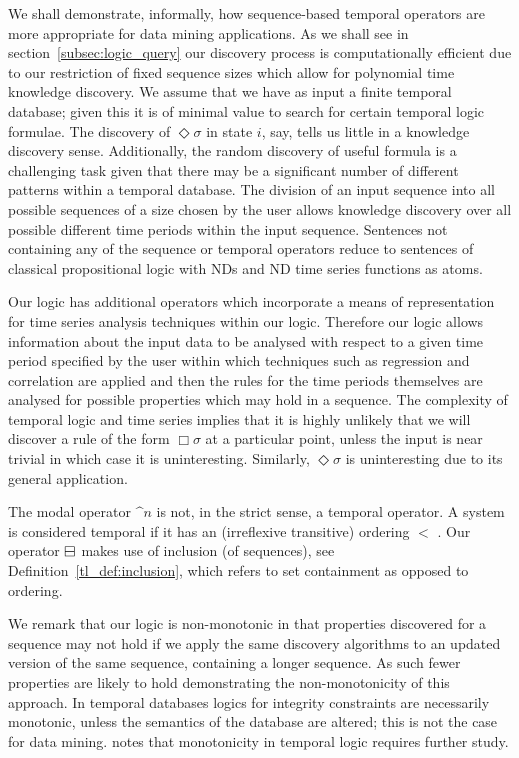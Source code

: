 \smallskip

We shall demonstrate, informally, how sequence-based temporal operators
are more appropriate for data mining applications. As we shall see in
section~\ref{subsec:logic_query} our discovery process is
computationally efficient due to our restriction of fixed sequence
sizes which allow for polynomial time knowledge discovery. We assume that we
have as input a finite temporal database; given this it is of minimal
value to search for certain temporal logic formulae. The discovery of
$\Diamond \sigma$ in state $i$, say, tells us little in a knowledge
discovery sense.  Additionally, the random discovery of useful formula
is a challenging task given that there may be a significant number of
different patterns within a temporal database. The division of an
input sequence into all possible sequences of a size chosen by the
user allows knowledge discovery over all possible different time
periods within the input sequence. Sentences not containing any of the
sequence or temporal operators reduce to sentences of classical
propositional logic with NDs and ND time series functions as atoms.

\medskip

Our logic has additional operators which incorporate a means of
representation for time series analysis techniques within our
logic. Therefore our logic allows information about the input data to
be analysed with respect to a given time period specified by the user
within which techniques such as regression and correlation are applied
and then the rules for the time periods themselves are analysed for
possible properties which may hold in a sequence. The complexity of
temporal logic and time series implies that it is highly unlikely that
we will discover a rule of the form $\Box \sigma$ at a particular
point, unless the input is near trivial in which case it is
uninteresting. Similarly, $\Diamond \sigma$ is uninteresting due to
its general application.

\medskip

The modal operator $\bm^n$ is not, in the strict sense, a temporal
operator. A system is considered temporal if it has an (irreflexive
transitive) ordering $<$ \cite{ghr94}. Our operator $\boxminus$ makes use of
inclusion (of sequences), see Definition~\ref{tl_def:inclusion}, which
refers to set containment as opposed to ordering.

\smallskip

We remark that our logic is non-monotonic in that properties
discovered for a sequence may not hold if we apply the same discovery
algorithms to an updated version of the same sequence, containing a
longer sequence. As such fewer properties are likely to hold
demonstrating the non-monotonicity of this approach. In temporal
databases logics for integrity constraints are necessarily
monotonic, unless the semantics of the database are altered;  
this is not the case for data mining.  \cite{ghr94} notes
that monotonicity in temporal logic requires further study. 


